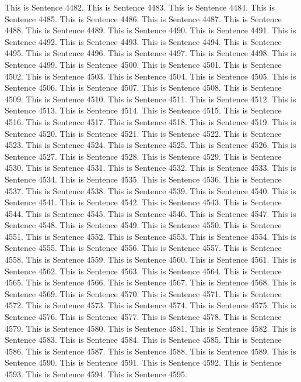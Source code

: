\documentclass{article}
\begin{document}
This is Sentence 4482.
This is Sentence 4483.
This is Sentence 4484.
This is Sentence 4485.
This is Sentence 4486.
This is Sentence 4487.
This is Sentence 4488.
This is Sentence 4489.
This is Sentence 4490.
This is Sentence 4491.
This is Sentence 4492.
This is Sentence 4493.
This is Sentence 4494.
This is Sentence 4495.
This is Sentence 4496.
This is Sentence 4497.
This is Sentence 4498.
This is Sentence 4499.
This is Sentence 4500.
This is Sentence 4501.
This is Sentence 4502.
This is Sentence 4503.
This is Sentence 4504.
This is Sentence 4505.
This is Sentence 4506.
This is Sentence 4507.
This is Sentence 4508.
This is Sentence 4509.
This is Sentence 4510.
This is Sentence 4511.
This is Sentence 4512.
This is Sentence 4513.
This is Sentence 4514.
This is Sentence 4515.
This is Sentence 4516.
This is Sentence 4517.
This is Sentence 4518.
This is Sentence 4519.
This is Sentence 4520.
This is Sentence 4521.
This is Sentence 4522.
This is Sentence 4523.
This is Sentence 4524.
This is Sentence 4525.
This is Sentence 4526.
This is Sentence 4527.
This is Sentence 4528.
This is Sentence 4529.
This is Sentence 4530.
This is Sentence 4531.
This is Sentence 4532.
This is Sentence 4533.
This is Sentence 4534.
This is Sentence 4535.
This is Sentence 4536.
This is Sentence 4537.
This is Sentence 4538.
This is Sentence 4539.
This is Sentence 4540.
This is Sentence 4541.
This is Sentence 4542.
This is Sentence 4543.
This is Sentence 4544.
This is Sentence 4545.
This is Sentence 4546.
This is Sentence 4547.
This is Sentence 4548.
This is Sentence 4549.
This is Sentence 4550.
This is Sentence 4551.
This is Sentence 4552.
This is Sentence 4553.
This is Sentence 4554.
This is Sentence 4555.
This is Sentence 4556.
This is Sentence 4557.
This is Sentence 4558.
This is Sentence 4559.
This is Sentence 4560.
This is Sentence 4561.
This is Sentence 4562.
This is Sentence 4563.
This is Sentence 4564.
This is Sentence 4565.
This is Sentence 4566.
This is Sentence 4567.
This is Sentence 4568.
This is Sentence 4569.
This is Sentence 4570.
This is Sentence 4571.
This is Sentence 4572.
This is Sentence 4573.
This is Sentence 4574.
This is Sentence 4575.
This is Sentence 4576.
This is Sentence 4577.
This is Sentence 4578.
This is Sentence 4579.
This is Sentence 4580.
This is Sentence 4581.
This is Sentence 4582.
This is Sentence 4583.
This is Sentence 4584.
This is Sentence 4585.
This is Sentence 4586.
This is Sentence 4587.
This is Sentence 4588.
This is Sentence 4589.
This is Sentence 4590.
This is Sentence 4591.
This is Sentence 4592.
This is Sentence 4593.
This is Sentence 4594.
This is Sentence 4595.
\end{document}
